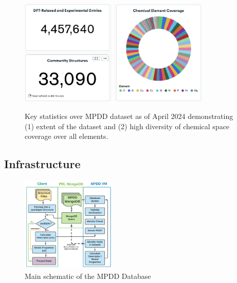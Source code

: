 \begin{figure}[H]
    \centering
    \includegraphics[width=0.4\textwidth]{mpdd/Screenshot 2024-05-05 at 11.54.32.png}
    \includegraphics[width=0.4\textwidth]{mpdd/Screenshot 2024-05-05 at 11.54.47.png}
    \caption{Key statistics over MPDD dataset as of April 2024 demonstrating (1) extent of the dataset and (2) high diversity of chemical space coverage over all elements.}
    \label{mpdd:fig:dataset}
\end{figure}

\subsection{Infrastructure} \label{mpdd:ssec:infrastructure}

\todo

\begin{figure}[H]
    \centering
    \includegraphics[width=0.4\textwidth]{mpdd/mpdd_core.png}
    \caption{Main schematic of the MPDD Database }
    \label{mpdd:fig:schematic}
\end{figure}


